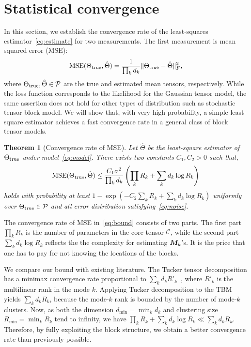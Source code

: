 \documentclass[11pt]{article}
\theoremstyle{plain}
\newtheorem{theorem}{Theorem}
\theoremstyle{definition}
\begin{document}
\section{Statistical convergence}\label{sec:theory}

In this section, we establish the convergence rate of the least-squares estimator~\eqref{eq:estimate} for two measurements. The first measurement is mean squared error (MSE):
\begin{equation} \label{eq:MSE}
\text{MSE}(\Theta_{\text{true}},\hat \Theta)={1\over \prod_k d_k}\lVert\Theta_{\text{true}}-\hat \Theta\rVert_F^2,
\end{equation}
where $\Theta_{\text{true}}, \hat \Theta\in\mathcal{P}$ are the true and estimated mean tensors, respectively. While the loss function corresponds to the likelihood for the Gaussian tensor model, the same assertion does not hold for other types of distribution such as stochastic tensor block model. We will show that, with very high probability, a simple least-square estimator achieves a fast convergence rate in a general class of block tensor models.  



\begin{theorem}[Convergence rate of MSE] \label{thm:mse}
Let $\hat \Theta$ be the least-square estimator of $\Theta_{\text{true}}$ under model~\eqref{eq:model}. There exists two constants $C_1, C_2>0$ such that,  
\begin{equation} \label{eq:bound}
\text{MSE}(\Theta_{\text{true}},\hat \Theta)\leq {C_1 \sigma^2\over  \prod_k d_k} \left(\prod_k R_k+\sum_k d_k \log R_k\right)
\end{equation}
holds with probability at least $1-\exp(-C_2\sum_k R_k+\sum_k d_k\log R_k)$ uniformly over $\Theta_{\text{true}}\in\mathcal{P}$ and all error distribution satisfying~\eqref{eq:noise}. 
\end{theorem}

The convergence rate of MSE in~\eqref{eq:bound} consists of two parts. The first part $\prod_k R_k$ is the number of parameters in the core tensor $\mathcal{C}$, while the second part $\sum_k d_k \log R_k$ reflects the the complexity for estimating $\bm M_k$'s. It is the price that one has to pay for not knowing the locations of the blocks.  

We compare our bound with existing literature. The Tucker tensor decomposition has a minimax convergence rate proportional to $\sum_kd_kR'_k$~\cite{zhang2018tensor}, where $R'_k$ is the multilinear rank in the mode $k$. Applying Tucker decomposition to the TBM yields $\sum_kd_kR_k$, because the mode-$k$ rank is bounded by the number of mode-$k$ clusters. Now, as both the dimension $d_{\min}=\min_kd_k$ and clustering size $R_{\min}=\min_k R_k$ tend to infinity, we have $\prod_k R_k+ \sum_k d_k \log R_k\ll \sum_k d_k R_k$. Therefore, by fully exploiting the block structure, we obtain a better convergence rate than previously possible. 
\end{document}
